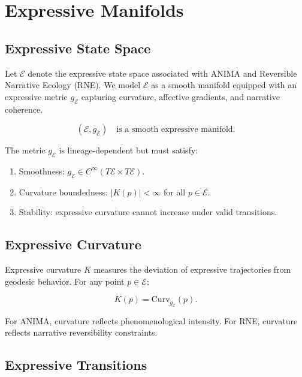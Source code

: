 
\section{Expressive Manifolds}
\label{sec:expressive-manifolds}

\subsection{Expressive State Space}

Let $\mathcal{E}$ denote the expressive state space associated with ANIMA and
Reversible Narrative Ecology (RNE). We model $\mathcal{E}$ as a smooth manifold
equipped with an expressive metric $g_{\mathcal{E}}$ capturing curvature,
affective gradients, and narrative coherence.

\[
(\mathcal{E}, g_{\mathcal{E}}) \quad \text{is a smooth expressive manifold.}
\]

The metric $g_{\mathcal{E}}$ is lineage-dependent but must satisfy:

\begin{enumerate}
    \item Smoothness: $g_{\mathcal{E}} \in C^\infty(T\mathcal{E} \times T\mathcal{E})$.
    \item Curvature boundedness: $|K(p)| < \infty$ for all $p \in \mathcal{E}$.
    \item Stability: expressive curvature cannot increase under valid transitions.
\end{enumerate}

\subsection{Expressive Curvature}

Expressive curvature $K$ measures the deviation of expressive trajectories from
geodesic behavior. For any point $p \in \mathcal{E}$:

\[
K(p) = \text{Curv}_{g_{\mathcal{E}}}(p).
\]

For ANIMA, curvature reflects phenomenological intensity.  
For RNE, curvature reflects narrative reversibility constraints.

\subsection{Expressive Transitions}

